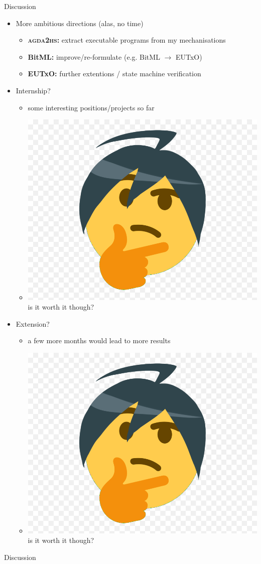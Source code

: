\documentclass[aspectratio=43]{beamer}
\begin{document}
\begin{frame}{Discussion}

\begin{itemize}
\item More ambitious directions (alas, no time)
  \begin{itemize}
  \item \textbf{\textsc{agda2hs}:} extract executable programs from my mechanisations
  \item \textbf{BitML:} improve/re-formulate (e.g. BitML $\to$ EUTxO)
  \item \textbf{EUTxO:} further extentions / state machine verification
  \end{itemize}
\pause
\item Internship?
  \begin{itemize}
  \item some interesting positions/projects so far
  \item[] \includegraphics[keepaspectratio=true,height=3ex]{emoji-thinking}
    is it worth it though?
  \end{itemize}
\pause
\item Extension?
  \begin{itemize}
  \item a few more months would lead to more results
  \item[] \includegraphics[keepaspectratio=true,height=3ex]{emoji-thinking}
    is it worth it though?
  \end{itemize}
\end{itemize}
\end{frame}

\begin{frame}[standout]
Discussion
\end{frame}
\end{document}
